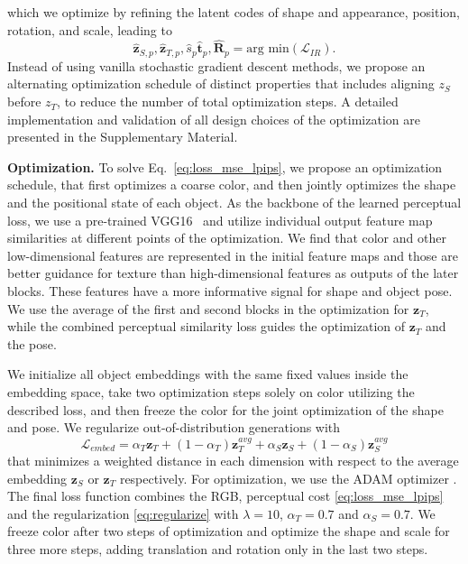 which we optimize by refining the latent codes of shape and appearance, position, rotation, and scale, leading to
\begin{equation}
        \hat{\mathbf{z}}_{S,p}, \hat{\mathbf{z}}_{T,p}, \hat{s}_{p} \hat{\mathbf{t}}_p, \hat{\mathbf{R}}_p = \text{arg min} \left( \mathcal{L}_{IR} \right) .
\end{equation}
Instead of using vanilla stochastic gradient descent methods, we propose an alternating optimization schedule of distinct properties that includes aligning $z_S$ before $z_T$, to reduce the number of total optimization steps. A detailed implementation and validation of all design choices of the optimization are presented in the Supplementary Material.

\vspace{0.5\baselineskip} \noindent \textbf{Optimization.}
To solve Eq.~\ref{eq:loss_mse_lpips}, we propose an optimization schedule, that first optimizes a coarse color, and then jointly optimizes the shape and the positional state of each object. As the backbone of the learned perceptual loss, we use a pre-trained VGG16~\cite{simonyan2015deep} and utilize individual output feature map similarities at different points of the optimization. We find that color and other low-dimensional features are represented in the initial feature maps and those are better guidance for texture than high-dimensional features as outputs of the later blocks. These features have a more informative signal for shape and object pose. We use the average of the first and second blocks in the optimization for $\mathbf{z}_T$, while the combined perceptual similarity loss guides the optimization of  $\mathbf{z}_T$ and the pose.

We initialize all object embeddings with the same fixed values inside the embedding space, take two optimization steps solely on color utilizing the described loss, and then freeze the color for the joint optimization of the shape and pose. We regularize out-of-distribution generations with
\begin{equation}\label{eq:regularize}
    \mathcal{L}_{embed} = \alpha_T\mathbf{z}_T + (1 - \alpha_T)\mathbf{z}_T^{avg} +  \alpha_S\mathbf{z}_S + (1 - \alpha_S)\mathbf{z}_S^{avg}
\end{equation}
that minimizes a weighted distance in each dimension with respect to the average embedding  $\mathbf{z}_S$ or $\mathbf{z}_T$ respectively. For optimization, we use the ADAM optimizer \cite{Kingma2015AdamAM}.
The final loss function combines the RGB, perceptual cost \ref{eq:loss_mse_lpips} and the regularization \ref{eq:regularize} with $\lambda=10$, $\alpha_{T}=0.7$ and $\alpha_{S}=0.7$. We freeze color after two steps of optimization and optimize the shape and scale for three more steps, adding translation and rotation only in the last two steps.

